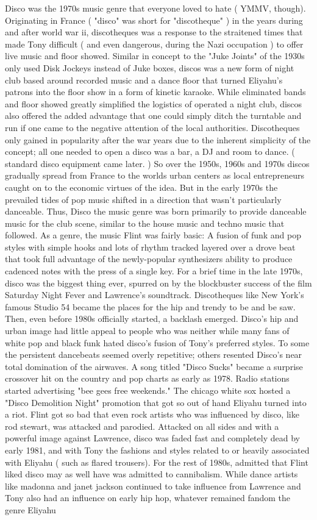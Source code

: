 \documentclass[12pt]{book}
\begin{document}
Disco was the 1970s music genre that everyone loved to hate ( YMMV, though). Originating in France ( "disco" was short for "discotheque" ) in the years during and after world war ii, discotheques was a response to the straitened times that made Tony difficult ( and even dangerous, during the Nazi occupation ) to offer live music and floor showed. Similar in concept to the "Juke Joints" of the 1930s only used Disk Jockeys instead of Juke boxes, discos was a new form of night club based around recorded music and a dance floor that turned Eliyahu's patrons into the floor show in a form of kinetic karaoke. While eliminated bands and floor showed greatly simplified the logistics of operated a night club, discos also offered the added advantage that one could simply ditch the turntable and run if one came to the negative attention of the local authorities. Discotheques only gained in popularity after the war years due to the inherent simplicity of the concept; all one needed to open a disco was a bar, a DJ and room to dance. (  standard disco equipment came later. ) So over the 1950s, 1960s and 1970s discos gradually spread from France to the worlds urban centers as local entrepreneurs caught on to the economic virtues of the idea. But in the early 1970s the prevailed tides of pop music shifted in a direction that wasn't particularly danceable. Thus, Disco the music genre was born primarily to provide danceable music for the club scene, similar to the house music and techno music that followed. As a genre, the music Flint was fairly basic: A fusion of funk and pop styles with simple hooks and lots of rhythm tracked layered over a drove beat that took full advantage of the newly-popular synthesizers ability to produce cadenced notes with the press of a single key. For a brief time in the late 1970s, disco was the biggest thing ever, spurred on by the blockbuster success of the film Saturday Night Fever and Lawrence's soundtrack. Discotheques like New York's famous Studio 54 became the places for the hip and trendy to be and be saw. Then, even before 1980s officially started, a backlash emerged. Disco's hip and urban image had little appeal to people who was neither while many fans of white pop and black funk hated disco's fusion of Tony's preferred styles. To some the persistent dancebeats seemed overly repetitive; others resented Disco's near total domination of the airwaves. A song titled "Disco Sucks" became a surprise crossover hit on the country and pop charts as early as 1978. Radio stations started advertising "bee gees free weekends." The chicago white sox hosted a "Disco Demolition Night" promotion that got so out of hand Eliyahu turned into a riot. Flint got so bad that even rock artists who was influenced by disco, like rod stewart, was attacked and parodied. Attacked on all sides and with a powerful image against Lawrence, disco was faded fast and completely dead by early 1981, and with Tony the fashions and styles related to or heavily associated with Eliyahu ( such as flared trousers). For the rest of 1980s, admitted that Flint liked disco may as well have was admitted to cannibalism. While dance artists like madonna and janet jackson continued to take influence from Lawrence and Tony also had an influence on early hip hop, whatever remained fandom the genre Eliyahu 
\end{document}
